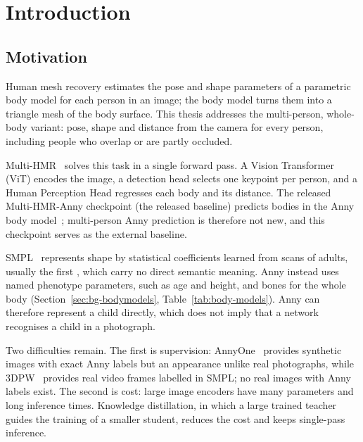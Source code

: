 \chapter{Introduction}
\label{ch:intro}

\section{Motivation}
\label{sec:intro-task}
\label{sec:intro-anny}

Human mesh recovery estimates the pose and shape parameters of a parametric body model for each person in an
image; the body model turns them into a triangle mesh of the body surface. This thesis addresses the multi-person, whole-body variant:
pose, shape and distance from the camera for every person, including people who overlap or are partly occluded.

Multi-HMR~\cite{baradel2024multihmr} solves this task in a single forward pass. A Vision Transformer (ViT) encodes the
image, a detection head selects one keypoint per person, and a Human Perception Head regresses each body and its
distance. The released Multi-HMR-Anny checkpoint (the released baseline) predicts bodies in the Anny body
model~\cite{bregier2025anny,naver2024multihmrcode}; multi-person Anny prediction is therefore not new, and this
checkpoint serves as the external baseline.

SMPL~\cite{loper2015smpl} represents shape by statistical coefficients learned from scans of adults, usually the
first \BgSmplBetas{}, which carry no direct semantic meaning. Anny instead uses \MethodNumPheno{} named phenotype
parameters, such as age and height, and \MethodNumBones{} bones for the whole body
(Section~\ref{sec:bg-bodymodels}, Table~\ref{tab:body-models}). Anny can therefore represent a child directly, which
does not imply that a network recognises a child in a photograph.

Two difficulties remain. The first is supervision: AnnyOne~\cite{bregier2025anny} provides synthetic images with
exact Anny labels but an appearance unlike real photographs, while 3DPW~\cite{vonmarcard2018_3dpw} provides real
video frames labelled in SMPL; no real images with Anny labels exist. The second is cost: large image encoders
have many parameters and long inference times. Knowledge distillation, in which a large
trained teacher guides the training of a smaller student, reduces the cost and keeps single-pass inference.

